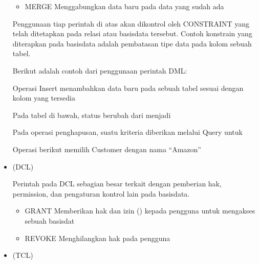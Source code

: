 \documentclass[letterpaper,10pt,english]{sphinxmanual}
\begin{document}
\begin{itemize}
\begin{itemize}
\item {} 
MERGE \sphinxhyphen{} Menggabungkan data baru pada data yang sudah ada

\end{itemize}

Penggunaan tiap perintah di atas akan dikontrol oleh CONSTRAINT yang telah ditetapkan pada relasi atau basisdata tersebut. Contoh konstrain yang diterapkan pada basisdata adalah pembatasan tipe data pada kolom sebuah tabel.

Berikut adalah contoh dari penggunaan perintah DML:


Operasi Insert menambahkan data baru pada sebuah tabel sesuai dengan kolom yang tersedia



Pada tabel di bawah, status  berubah dari  menjadi 


Pada operasi penghapusan, suatu kriteria diberikan melalui Query untuk


Operasi berikut memilih Customer dengan nama “Amazon”

\item {} 
 (DCL)

Perintah pada DCL sebagian besar terkait dengan pemberian hak, permission, dan pengaturan kontrol lain pada basisdata.
\begin{itemize}
\item {} 
GRANT \sphinxhyphen{} Memberikan hak dan izin () kepada pengguna untuk mengakses sebuah basisdat

\item {} 
REVOKE \sphinxhyphen{} Menghilangkan hak pada pengguna

\end{itemize}

\item {} 
 (TCL)


\end{itemize}
\end{document}
